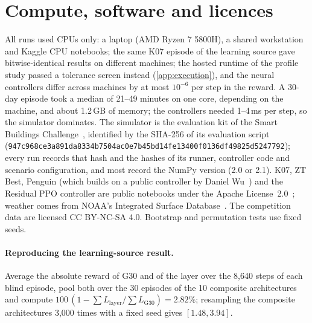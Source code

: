 \section{Compute, software and licences}\label{app:compute}
All runs used CPUs only: a laptop (AMD Ryzen 7 5800H), a shared workstation and Kaggle CPU notebooks; the same K07 episode of the
learning source gave bitwise-identical results on different machines; the hosted runtime of the profile study
passed a tolerance screen instead (\cref{app:execution}), and the neural controllers differ across machines by at most $10^{-6}$
per step in the reward. A 30-day episode took a median of 21--49 minutes on one
core, depending on the machine, and about 1.2\,GB of memory; the controllers needed 1--4\,ms per step, so the simulator
dominates. The simulator is the evaluation kit of the Smart Buildings Challenge~\cite{goldfeder2026challenge}, identified by
the SHA-256 of its evaluation script (\texttt{947c968ce3a891da\allowbreak 8334b7504ac0e7b4\allowbreak 5bd14fe13400f013\allowbreak 6df49825d5247792}); every run records that hash and the hashes of its runner,
controller code and scenario configuration, and most record the NumPy version (2.0 or 2.1). K07, ZT Best, Penguin (which builds on a public controller by Daniel
Wu~\cite{wu2026cpub}) and the Residual PPO controller are public notebooks under the Apache License~2.0~\cite{malyshev2026k07,malyshev2026zt,penguin2026deep,chilton2026resppo}; weather comes from
NOAA's Integrated Surface Database~\cite{smith2011isd}. The competition data are licensed CC BY-NC-SA 4.0. Bootstrap and permutation tests use fixed seeds.

\paragraph{Reproducing the learning-source result.} Average the absolute reward of G30 and of the layer over the 8,640 steps of
each blind episode, pool both over the 30 episodes of the 10 composite architectures and compute
$100\,(1 - \sum L_{\mathrm{layer}} / \sum L_{\mathrm{G30}}) = 2.82\%$; resampling the composite architectures 3,000 times with a
fixed seed gives $[1.48, 3.94]$.
